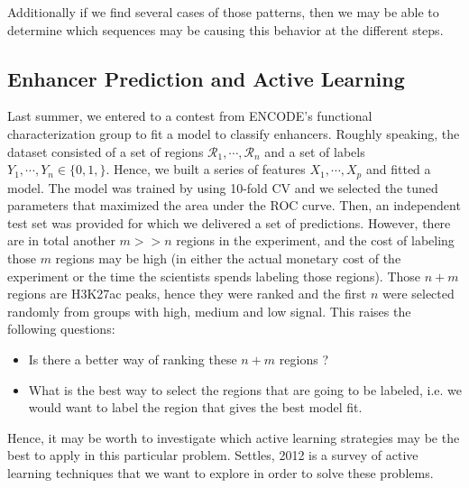 \documentclass[11pt]{article}\usepackage[]{graphicx}\usepackage[]{color}
\begin{document}
Additionally if we find several cases of those patterns, then we may
be able to determine which sequences may be causing this behavior at
the different steps.

\subsection{Enhancer Prediction and Active Learning}
\label{sec:enhancer}

Last summer, we entered to a contest from ENCODE's functional
characterization group to fit a model to classify enhancers. Roughly
speaking, the dataset consisted of a set of regions
$\mathcal{R}_1,\cdots,\mathcal{R}_n$ and a set of labels
$Y_1,\cdots,Y_n \in \{0,1,\}$. Hence, we built a series of features
$X_1,\cdots,X_p$ and fitted a model. The model was trained by using
10-fold CV and we selected the tuned parameters that maximized the
area under the ROC curve. Then, an independent test set was provided
for which we delivered a set of predictions. However, there are in
total another $m >> n$ regions in the experiment, and the cost of
labeling those $m$ regions may be high (in either the actual monetary
cost of the experiment or the time the scientists spends labeling
those regions). Those $n+m$ regions are H3K27ac peaks, hence they were
ranked and the first $n$ were selected randomly from groups with high,
medium and low signal. This raises the following questions:



\begin{itemize}
\item Is there a better way of ranking these $n+m$ regions ?
\item What is the best way to select the regions that are going to be
  labeled, i.e. we would want to label the region that gives the
  best model fit.
\end{itemize}

Hence, it may be worth to investigate which active learning strategies
may be the best to apply in this particular problem. Settles, 2012
\cite{al} is a survey of active learning techniques that we want to
explore in order to solve these problems.

\newpage


\nocite{exo_review}
\nocite{exo_gb}
\nocite{maplot1}
\nocite{maplot2}
\nocite{esl}
\nocite{anp}
\nocite{al}
\nocite{oc_review}
\nocite{exo4}
\end{document}
